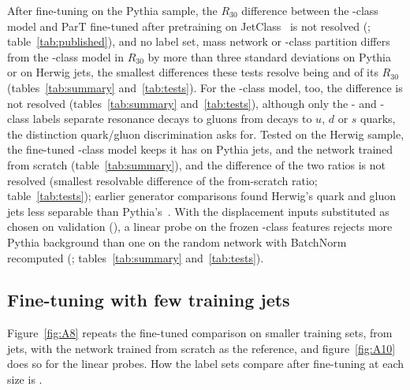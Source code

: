 After fine-tuning on the Pythia sample, the $R_{30}$ difference between the \Kfull-class model and ParT fine-tuned
after pretraining on JetClass~\cite{part} is not resolved (\MlstFtQgRthirtyFullOverPartPr{};
table~\ref{tab:published}), and no label set, mass network or \Kcoarse-class partition differs from the
\Kfull-class model in $R_{30}$ by more than three standard deviations on Pythia or on Herwig jets, the smallest
differences these tests resolve being \MlstPwRthirtyFtQg{} and \MlstPwRthirtyFtHerwig{} of its $R_{30}$
(tables~\ref{tab:summary} and~\ref{tab:tests}). For the \Kcoarse-class model, too, the difference is not resolved %
(tables~\ref{tab:summary} and~\ref{tab:tests}), although only the %
\Kfull- and \Kres-class labels separate resonance decays to gluons from decays to $u$, $d$ or $s$ quarks, the
distinction quark/gluon discrimination asks for. Tested on the Herwig sample, the fine-tuned \Kfull-class model
keeps \MlstFtQgRthirtyHerwigOverPythiaFullPr{} it has on Pythia jets, and the network trained from scratch %
\MlstFtQgRthirtyHerwigOverPythiaScratchPr{} (table~\ref{tab:summary}), and the difference of the two ratios is not
resolved (smallest resolvable difference \MlstPwHerwigRatio{} of the from-scratch ratio; table~\ref{tab:tests});
earlier generator comparisons found
Herwig's quark and gluon jets less separable than Pythia's~\cite{gras}. With the displacement inputs substituted
as chosen on validation (\LpSubstitutionQg), a linear probe on the frozen \Kfull-class features rejects more
Pythia background than one on the random network with BatchNorm recomputed (\MlstLpQgRthirtyFullOverInitBnPr{};
tables~\ref{tab:summary} and~\ref{tab:tests}).

\subsection{Fine-tuning with few training jets}\label{sec:fewjets}

Figure~\ref{fig:A8} repeats the fine-tuned comparison on smaller training sets, from \FtSizeEThree{} jets, with
the network trained from scratch as the reference, and figure~\ref{fig:A10} does so for the linear probes. How
the label sets compare after fine-tuning at each size is .

